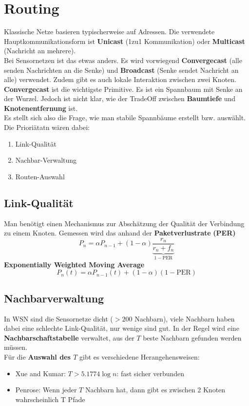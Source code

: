 \documentclass[a4paper]{article}
\begin{document}
\newpage
\section{Routing}
Klassische Netze basieren typischerweise auf Adressen. Die verwendete Hauptkommunikationsform ist \textbf{Unicast} (1zu1 Kommunikation) oder \textbf{Multicast} (Nachricht an mehrere).\\

Bei Sensornetzen ist das etwas anders. Es wird vorwiegend \textbf{Convergecast} (alle senden Nachrichten an die Senke) und \textbf{Broadcast} (Senke sendet Nachricht an alle) verwendet.
Zudem gibt es auch lokale Interaktion zwischen zwei Knoten.\\

\textbf{Convergecast} ist die wichtigste Primitive. Es ist ein Spannbaum mit Senke an der Wurzel. Jedoch ist nicht klar, wie der TradeOff zwischen \textbf{Baumtiefe} und \textbf{Knotenentfernung} ist. \\

Es stellt sich also die Frage, wie man stabile Spannbäume erstellt bzw. auswählt. Die Prioriätatn wären dabei: 
\begin{enumerate}
	\item Link-Qualität
	\item Nachbar-Verwaltung
	\item Routen-Auswahl
\end{enumerate}

\subsection{Link-Qualität}
Man benötigt einen Mechanismus zur Abschätzung der Qualität der Verbindung zu einem Knoten.
Gemessen wird das anhand der \textbf{Paketverlustrate} \textbf{(PER)}
$$P_n = \alpha P_{n-1} + (1-\alpha) \underbrace{\dfrac{r_n}{r_n + f_n}}_{1-\text{PER}}$$
\textbf{Exponentially Weighted Moving Average}
$$P_n(t) = \alpha P_{n-1}(t) + (1-\alpha) (1-\text{PER})$$
\subsection{Nachbarverwaltung}
In WSN sind die Sensornetze dicht ($>200$ Nachbarn), viele Nachbarn haben dabei eine schlechte Link-Qualität, nur wenige sind gut. In der Regel wird eine \textbf{Nachbarschaftstabelle} verwaltet, aus der $T$ beste Nachbarn gefunden werden müssen.\\

Für die \textbf{Auswahl des $T$} gibt es verschiedene Herangehensweisen:
\begin{itemize}
	\item Xue and Kumar: $T>5.1774 \log n$: fast sicher verbunden
	\item Penrose: Wenn jeder $T$ Nachbarn hat, dann gibt es zwischen 2 Knoten wahrscheinlich T Pfade 
\end{itemize}
\end{document}
